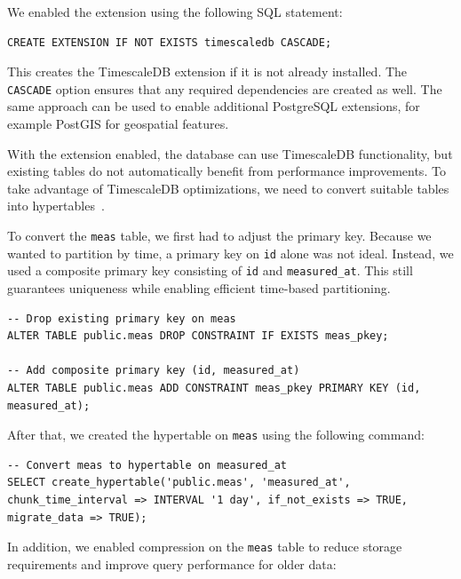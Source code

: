 We enabled the extension using the following SQL statement:

\begin{lstlisting}[language=PGTSSQL, caption={SQL command to activate the TimescaleDB extension.}, label={lst:sql-activate-timescaledb}]
CREATE EXTENSION IF NOT EXISTS timescaledb CASCADE;
\end{lstlisting}

This creates the TimescaleDB extension if it is not already installed. The
\texttt{CASCADE} option ensures that any required dependencies are created as
well. The same approach can be used to enable additional PostgreSQL extensions,
for example PostGIS for geospatial features.

With the extension enabled, the database can use TimescaleDB functionality, but
existing tables do not automatically benefit from performance improvements. To
take advantage of TimescaleDB optimizations, we need to convert suitable tables
into hypertables~\cite{TimescaleDB:02}.

To convert the \texttt{meas} table, we first had to adjust the primary key.
Because we wanted to partition by time, a primary key on \texttt{id} alone was
not ideal. Instead, we used a composite primary key consisting of \texttt{id}
and \texttt{measured\_at}. This still guarantees uniqueness while enabling
efficient time-based partitioning.

\begin{lstlisting}[language=PGTSSQL, caption={SQL commands to adjust the primary key of the "meas" table.}, label={lst:sql-create-hypertable}]
-- Drop existing primary key on meas
ALTER TABLE public.meas DROP CONSTRAINT IF EXISTS meas_pkey;

-- Add composite primary key (id, measured_at)
ALTER TABLE public.meas ADD CONSTRAINT meas_pkey PRIMARY KEY (id, measured_at);
\end{lstlisting}

After that, we created the hypertable on \texttt{meas} using the following
command:

\begin{lstlisting}[language=PGTSSQL, caption={SQL command to create a hypertable on the "meas" table.}, label={lst:sql-create-hypertable-convert}]
-- Convert meas to hypertable on measured_at
SELECT create_hypertable('public.meas', 'measured_at', chunk_time_interval => INTERVAL '1 day', if_not_exists => TRUE, migrate_data => TRUE);
\end{lstlisting}

In addition, we enabled compression on the \texttt{meas} table to reduce
storage requirements and improve query performance for older data:

